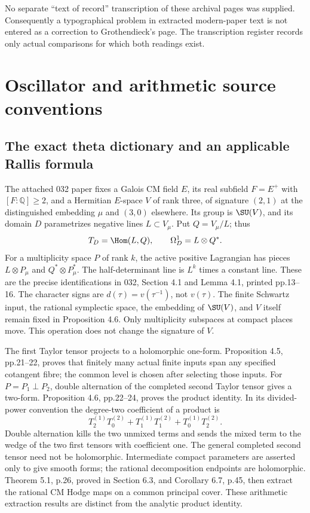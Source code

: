 \documentclass[11pt]{article}
\newcommand{\Q}{\mathbb Q}\newcommand{\C}{\mathbb C}\newcommand{\Z}{\mathbb Z}\newcommand{\R}{\mathbb R}\newcommand{\A}{\mathbb A}\newcommand{\OO}{\mathcal O}
\theoremstyle{definition}\newtheorem{definition}[theorem]{Definition}\newtheorem{remark}[theorem]{Remark}
\begin{document}
No separate ``text of record'' transcription of these archival pages was supplied. Consequently a typographical problem in extracted modern-paper text is not entered as a correction to Grothendieck's page. The transcription register records only actual comparisons for which both readings exist.


\section{Oscillator and arithmetic source conventions}


\subsection{The exact theta dictionary and an applicable Rallis formula}

The attached 032 paper fixes a Galois CM field $E$, its real subfield
$F=E^+$ with $[F:\Q]\geq2$, and a Hermitian $E$-space $V$ of rank three,
of signature $(2,1)$ at the distinguished embedding $\mu$ and $(3,0)$
elsewhere. Its group is $\SU(V)$, and its domain $D$ parametrizes negative
lines $L\subset V_\mu$. Put $Q=V_\mu/L$; thus
\[
 T_D=\Hom(L,Q),\qquad \Omega_D^1=L\otimes Q^*.
\]
For a multiplicity space $P$ of rank $k$, the active positive Lagrangian
has pieces $L\otimes P_\mu$ and $Q^*\otimes P_\mu^*$. The half-determinant
line is $L^k$ times a constant line. These are the precise identifications
in 032, Section 4.1 and Lemma 4.1, printed pp.13--16. The character signs
are $d(\tau)=v(\tau^{-1})$, not $v(\tau)$. The finite Schwartz input, the
rational symplectic space, the embedding of $\SU(V)$, and $V$ itself remain
fixed in Proposition 4.6. Only multiplicity subspaces at compact places
move. This operation does not change the signature of $V$.

The first Taylor tensor projects to a holomorphic one-form. Proposition
4.5, pp.21--22, proves that finitely many actual finite inputs span any
specified cotangent fibre; the common level is chosen after selecting
those inputs. For $P=P_1\perp P_2$, double alternation of the completed
second Taylor tensor gives a two-form. Proposition 4.6, pp.22--24, proves
the product identity. In its divided-power convention the degree-two
coefficient of a product is
\[
 T_2^{(1)}T_0^{(2)}+T_1^{(1)}T_1^{(2)}+T_0^{(1)}T_2^{(2)}.
\]
Double alternation kills the two unmixed terms and sends the mixed term
to the wedge of the two first tensors with coefficient one. The general
completed second tensor need not be holomorphic. Intermediate compact
parameters are asserted only to give smooth forms; the rational
decomposition endpoints are holomorphic. Theorem 5.1, p.26, proved in
Section 6.3, and Corollary 6.7, p.45, then extract the rational CM Hodge
maps on a common principal cover. These arithmetic extraction results
are distinct from the analytic product identity.
\end{document}
